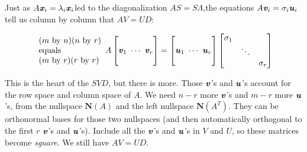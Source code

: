 Just as $ A\textbf{\textit{x}}_{i}=\lambda_{i}\textbf{\textit{x}}_{i}$led to the diagonalization $AS=S\Lambda $,the equations $ A\textbf{\textit{v}}_{i}=\sigma_{i}\textbf{\textit{u}}_{i}$tell us column by column that $AV=UD$:

\begin{align}
\begin{array}{l}
(m \ \text{by} \ n)(n \ \text{by} \ r) \\
\text{equals} \\              
(m \ \text{by} \ r) (r \ \text{by} \ r)
\end{array}  A
\begin{bmatrix}
\ \\
\textbf{\textit{v}}_{1} \ \cdots \ \textbf{\textit{v}}_{r}\\
\ 
\end{bmatrix}=
\begin{bmatrix}
\ \\
\textbf{\textit{u}}_{1} \ \cdots \ \textbf{\textit{u}}_{r}\\
\ 
\end{bmatrix}
\begin{bmatrix}
\sigma_{1}  & & \\
& \ddots &\\
& & \sigma_{r} 
\end{bmatrix}
\end{align}
\begin{flushleft}
	This is the heart of the $SVD$, but there is more. Those $\textbf{\textit{v}}$'s and $\textbf{\textit{u}}$'s account for the row space and column space of $A$. We need $n-r$ more $\textbf{\textit{v}}$'s and $m-r$ more $\textbf{\textit{u}}$'s, from the nullspace $ \textbf{N}(A)$ and the left nullspace $\textbf{N}(A^{T})$. They can be orthonormal bases for those two nullspaces (and then automatically orthogonal to the first $r$ $\textbf{\textit{v}}$'s and $\textbf{\textit{u}}$'s). Include all the $\textbf{\textit{v}}$'s and $\textbf{\textit{u}}$'s in $V$ and $U$, so these
	matrices become \textit{sguare}. We still have $AV=UD$.
\end{flushleft}
